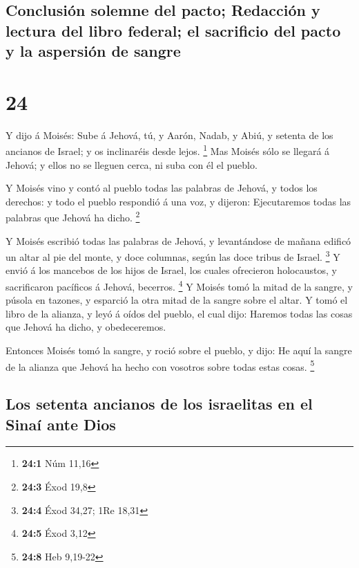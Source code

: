 \hypertarget{conclusiuxf3n-solemne-del-pacto-redacciuxf3n-y-lectura-del-libro-federal-el-sacrificio-del-pacto-y-la-aspersiuxf3n-de-sangre}{%
\subsection{Conclusión solemne del pacto; Redacción y lectura del libro
federal; el sacrificio del pacto y la aspersión de
sangre}\label{conclusiuxf3n-solemne-del-pacto-redacciuxf3n-y-lectura-del-libro-federal-el-sacrificio-del-pacto-y-la-aspersiuxf3n-de-sangre}}

\hypertarget{section-23}{%
\section{24}\label{section-23}}

 Y dijo á Moisés: Sube á Jehová, tú, y Aarón, Nadab, y
Abiú, y setenta de los ancianos de Israel; y os inclinaréis desde lejos.
\footnote{\textbf{24:1} Núm 11,16}  Mas Moisés sólo se
llegará á Jehová; y ellos no se lleguen cerca, ni suba con él el pueblo.

 Y Moisés vino y contó al pueblo todas las palabras de
Jehová, y todos los derechos: y todo el pueblo respondió á una voz, y
dijeron: Ejecutaremos todas las palabras que Jehová ha dicho.
\footnote{\textbf{24:3} Éxod 19,8}

 Y Moisés escribió todas las palabras de Jehová, y
levantándose de mañana edificó un altar al pie del monte, y doce
columnas, según las doce tribus de Israel. \footnote{\textbf{24:4} Éxod
  34,27; 1Re 18,31}  Y envió á los mancebos de los hijos
de Israel, los cuales ofrecieron holocaustos, y sacrificaron pacíficos á
Jehová, becerros. \footnote{\textbf{24:5} Éxod 3,12}  Y
Moisés tomó la mitad de la sangre, y púsola en tazones, y esparció la
otra mitad de la sangre sobre el altar.  Y tomó el libro
de la alianza, y leyó á oídos del pueblo, el cual dijo: Haremos todas
las cosas que Jehová ha dicho, y obedeceremos.

 Entonces Moisés tomó la sangre, y roció sobre el pueblo,
y dijo: He aquí la sangre de la alianza que Jehová ha hecho con vosotros
sobre todas estas cosas. \footnote{\textbf{24:8} Heb 9,19-22}

\hypertarget{los-setenta-ancianos-de-los-israelitas-en-el-sinauxed-ante-dios}{%
\subsection{Los setenta ancianos de los israelitas en el Sinaí ante
Dios}\label{los-setenta-ancianos-de-los-israelitas-en-el-sinauxed-ante-dios}}


